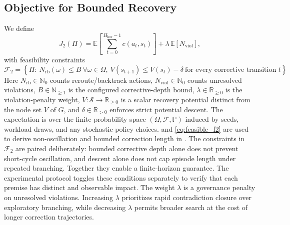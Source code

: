 \documentclass{article} %
\begin{document}
\subsection{Objective for Bounded Recovery}
We define
\begin{equation}
J_2(\Pi)=\mathbb{E}\!\left[\sum_{t=0}^{H_{\mathrm{hor}}-1}c(a_t,s_t)\right]+\lambda\,\mathbb{E}[N_{\mathrm{viol}}],
\label{eq:objective_j2}
\end{equation}
with feasibility constraints
\begin{equation}
\mathcal{F}_2=\left\{\Pi:\ N_{\mathrm{rb}}(\omega)\le B\ \forall\omega\in\Omega,\ V(s_{t+1})\le V(s_t)-\delta\ \text{for every corrective transition }t\right\}.
\label{eq:feasible_f2}
\end{equation}
Here $N_{\mathrm{rb}}\in\mathbb{N}_0$ counts reroute/backtrack actions, $N_{\mathrm{viol}}\in\mathbb{N}_0$ counts unresolved violations, $B\in\mathbb{N}_{\ge1}$ is the configured corrective-depth bound, $\lambda\in\mathbb{R}_{\ge0}$ is the violation-penalty weight, $V:\mathcal{S}\to\mathbb{R}_{\ge0}$ is a scalar recovery potential distinct from the node set $V$ of $G$, and $\delta\in\mathbb{R}_{>0}$ enforces strict potential descent. The expectation is over the finite probability space $(\Omega,\mathcal{F},\mathbb{P})$ induced by seeds, workload draws, and any stochastic policy choices.  and \eqref{eq:feasible_f2} are used to derive non-oscillation and bounded correction length in .
The constraints in $\mathcal{F}_2$ are paired deliberately: bounded corrective depth alone does not prevent short-cycle oscillation, and descent alone does not cap episode length under repeated branching. Together they enable a finite-horizon guarantee. The experimental protocol toggles these conditions separately to verify that each premise has distinct and observable impact.
The weight $\lambda$ is a governance penalty on unresolved violations. Increasing $\lambda$ prioritizes rapid contradiction closure over exploratory branching, while decreasing $\lambda$ permits broader search at the cost of longer correction trajectories.
\end{document}
